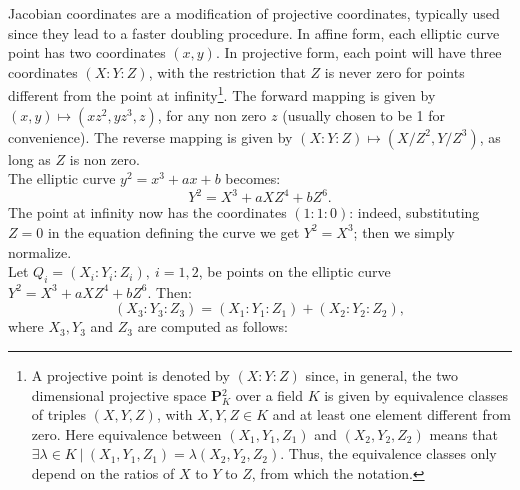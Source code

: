 \bigskip
\noindent
Jacobian coordinates are a modification of projective coordinates, typically used since they lead to a faster doubling procedure. In affine form, each elliptic curve point has two coordinates $(x, y)$. In projective form, each point will have three coordinates $(X : Y : Z)$, with the restriction that $Z$ is never zero for points different from the point at infinity\footnote{A projective point is denoted by $(X : Y : Z)$ since, in general, the two dimensional projective space \textbf{P}$_K^2$ over a field $K$ is given by equivalence classes of triples $(X, Y, Z)$, with $X, Y, Z \in K$ and at least one element different from zero. Here equivalence between $(X_1, Y_1, Z_1)$ and $(X_2, Y_2, Z_2)$ means that $\exists \lambda \in K \ | \ (X_1, Y_1, Z_1) = \lambda(X_2, Y_2, Z_2)$. Thus, the equivalence classes only depend on the ratios of $X$ to $Y$ to $Z$, from which the notation.}. The forward mapping is given by $(x, y) \mapsto (xz^2, yz^3, z)$, for any non zero $z$ (usually chosen to be 1 for convenience). The reverse mapping is given by $(X : Y : Z) \mapsto (X/Z^2, Y/Z^3)$, as long as $Z$ is non zero.
\\
The elliptic curve $y^2 = x^3 + ax + b$ becomes:
$$Y^2 = X^3 + aXZ^4 + bZ^6.$$
The point at infinity now has the coordinates $(1 : 1 : 0)$: indeed, substituting $Z = 0$ in the equation defining the curve we get $Y^2 = X^3$; then we simply normalize.
\\
Let $Q_i = (X_i : Y_i : Z_i), \ i = 1, 2$, be points on the elliptic curve $Y^2 = X^3 + aXZ^4 + bZ^6$. Then:
$$(X_3 : Y_3 : Z_3) = (X_1 : Y_1 : Z_1) + (X_2 : Y_2 : Z_2),$$
where $X_3,Y_3$ and $Z_3$ are computed as follows:
